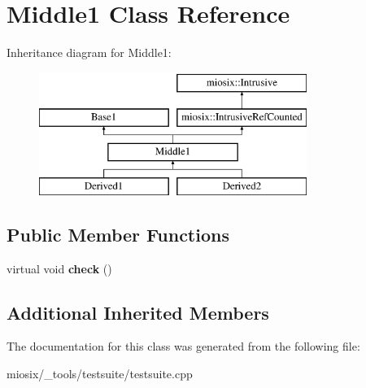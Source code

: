 \hypertarget{class_middle1}{\section{Middle1 Class Reference}
\label{class_middle1}
}
Inheritance diagram for Middle1\-:\begin{figure}[H]
\begin{center}
\leavevmode
\includegraphics[height=4.000000cm]{class_middle1}
\end{center}
\end{figure}
\subsection*{Public Member Functions}
\begin{DoxyCompactItemize}
\item 
\hypertarget{class_middle1_a4dee2b1bd50430d326027429ce340cc5}{virtual void {\bfseries check} ()}\label{class_middle1_a4dee2b1bd50430d326027429ce340cc5}

\end{DoxyCompactItemize}
\subsection*{Additional Inherited Members}


The documentation for this class was generated from the following file\-:\begin{DoxyCompactItemize}
\item 
miosix/\-\_\-tools/testsuite/testsuite.\-cpp\end{DoxyCompactItemize}
